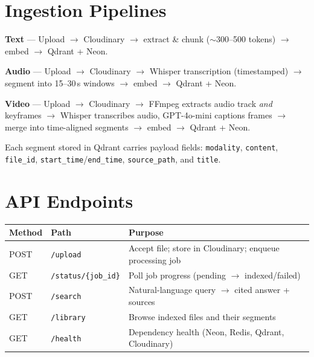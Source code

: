 \documentclass[10pt,a4paper]{article}
\begin{document}
\newpage
\section{Ingestion Pipelines}

\textbf{Text} --- Upload $\rightarrow$ Cloudinary $\rightarrow$ extract \& chunk ($\sim$300--500 tokens) $\rightarrow$ embed $\rightarrow$ Qdrant + Neon.

\textbf{Audio} --- Upload $\rightarrow$ Cloudinary $\rightarrow$ Whisper transcription (timestamped) $\rightarrow$ segment into 15--30\,s windows $\rightarrow$ embed $\rightarrow$ Qdrant + Neon.

\textbf{Video} --- Upload $\rightarrow$ Cloudinary $\rightarrow$ FFmpeg extracts audio track \emph{and} keyframes $\rightarrow$ Whisper transcribes audio, GPT-4o-mini captions frames $\rightarrow$ merge into time-aligned segments $\rightarrow$ embed $\rightarrow$ Qdrant + Neon.

Each segment stored in Qdrant carries payload fields: \texttt{modality}, \texttt{content}, \texttt{file\_id}, \texttt{start\_time}/\texttt{end\_time}, \texttt{source\_path}, and \texttt{title}.

\section{API Endpoints}

\begin{table}[h]
\centering\small
\begin{tabular}{@{}llp{5.5cm}@{}}
\toprule
\textbf{Method} & \textbf{Path} & \textbf{Purpose} \\
\midrule
POST & \texttt{/upload} & Accept file; store in Cloudinary; enqueue processing job \\
GET  & \texttt{/status/\{job\_id\}} & Poll job progress (pending $\rightarrow$ indexed/failed) \\
POST & \texttt{/search} & Natural-language query $\rightarrow$ cited answer + sources \\
GET  & \texttt{/library} & Browse indexed files and their segments \\
GET  & \texttt{/health} & Dependency health (Neon, Redis, Qdrant, Cloudinary) \\
\bottomrule
\end{tabular}
\end{table}
\end{document}

